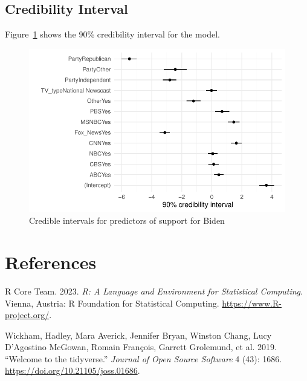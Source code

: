 \documentclass[
  letterpaper,
  DIV=11,
  numbers=noendperiod]{scrartcl}
\newlength{\cslhangindent}
\newlength{\cslentryspacingunit} %
\newenvironment{CSLReferences}[2] %
 {%
  \setlength{\parindent}{0pt}
  \ifodd #1
  \let\oldpar\par
  \def\par{\hangindent=\cslhangindent\oldpar}
  \fi
  \setlength{\parskip}{#2\cslentryspacingunit}
 }%
 {}
\begin{document}
\hypertarget{sec-credibility-interval}{%
\subsection{Credibility Interval}\label{sec-credibility-interval}}

Figure~\ref{fig-modelresults1} shows the 90\% credibility interval for
the model.

\begin{figure}

{\centering \includegraphics{paper_files/figure-pdf/fig-modelresults1-1.pdf}

}

\caption{\label{fig-modelresults1}Credible intervals for predictors of
support for Biden}

\end{figure}

\newpage

\hypertarget{references}{%
\section*{References}\label{references}}

\hypertarget{refs}{}
\begin{CSLReferences}{1}{0}
\leavevmode{}%
R Core Team. 2023. \emph{R: A Language and Environment for Statistical
Computing}. Vienna, Austria: R Foundation for Statistical Computing.
\url{https://www.R-project.org/}.

\leavevmode{}%
Wickham, Hadley, Mara Averick, Jennifer Bryan, Winston Chang, Lucy
D'Agostino McGowan, Romain François, Garrett Grolemund, et al. 2019.
{``Welcome to the {tidyverse}.''} \emph{Journal of Open Source Software}
4 (43): 1686. \url{https://doi.org/10.21105/joss.01686}.

\end{CSLReferences}
\end{document}
